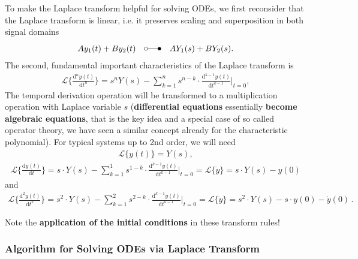 \documentclass[11pt,a4paper,DIV=12]{scrartcl}
\begin{document}
To make the Laplace transform helpful for solving ODEs, we first reconsider
that the Laplace transform is linear, i.e. it preserves scaling and
superposition in both signal domains
\begin{align}
A y_1(t) + B y_2(t) \quad \laplace \quad A Y_1(s) + B Y_2(s).
\end{align}
The second, fundamental important characteristics of the Laplace transform is
\begin{align}
\mathcal{L}\{\frac{\mathrm{d}^n y(t)}{\mathrm{d} t^n}\}=
s^n Y(s) - \sum_{k=1}^{n} s^{n-k} \cdot
\frac{\mathrm{d}^{k-1} y(t)}{\mathrm{d} t^{k-1}}\bigg|_{t=0},
\end{align}
The temporal derivation operation will be transformed to a multiplication
operation with Laplace variable $s$ (\textbf{differential equations} essentially \textbf{become
algebraic equations}, that is the key idea and a special case of
so called operator theory, we have seen a similar concept already for the
characteristic polynomial).
%
For typical systems up to 2nd order, we will need
\begin{align}
\label{eq:Laplace0thd}
\boxed{\mathcal{L}\{{y(t)}\} = Y(s)},
\end{align}
\begin{align}
\label{eq:Laplace1std}
\mathcal{L}\{\frac{\mathrm{d} y(t)}{\mathrm{d} t}\}=
s \cdot Y(s) - \sum_{k=1}^{1} s^{1-k} \cdot
\frac{\mathrm{d}^{k-1} y(t)}{\mathrm{d} t^{k-1}}\bigg|_{t=0}
= \boxed{\mathcal{L}\{\dot{y}\} = s \cdot Y(s) - y(0)}
\end{align}
and
\begin{align}
\label{eq:Laplace2ndd}
\mathcal{L}\{\frac{\mathrm{d}^2 y(t)}{\mathrm{d} t^2}\}=
s^2 \cdot Y(s) - \sum_{k=1}^{2} s^{2-k} \cdot
\frac{\mathrm{d}^{k-1} y(t)}{\mathrm{d} t^{k-1}}\bigg|_{t=0}
= \boxed{\mathcal{L}\{\ddot{y}\} = s^2 \cdot Y(s) - s \cdot y(0) - \dot{y}(0)}\,.
\end{align}

Note the \textbf{application of the initial conditions} in these transform rules!

\subsubsection{Algorithm for Solving ODEs via Laplace Transform}
\end{document}
